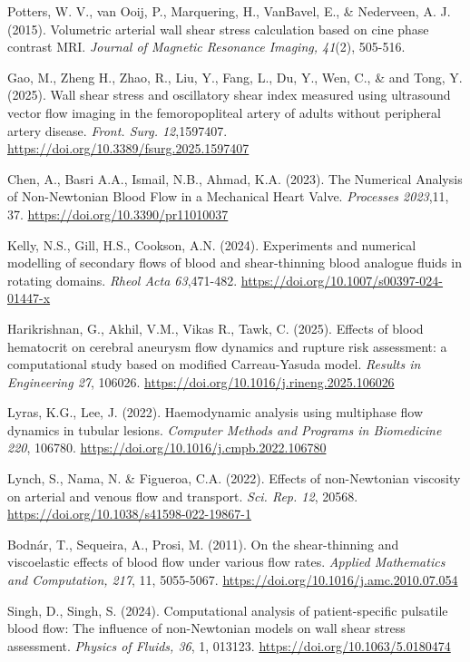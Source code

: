 ﻿\documentclass[12pt,a4paper]{article}
\theoremstyle{definition}
\numberwithin{equation}{section}
\begin{document}
\begin{thebibliography}{}
 Potters, W. V., van Ooij, P., Marquering, H., VanBavel, E., \& Nederveen, A. J. (2015). Volumetric arterial wall shear stress calculation based on cine phase contrast MRI. \textit{Journal of Magnetic Resonance Imaging, 41}(2), 505-516.

 Gao, M., Zheng H., Zhao, R., Liu, Y., Fang, L., Du, Y., Wen, C., \& and Tong, Y. (2025). Wall shear stress and oscillatory shear index measured using ultrasound vector flow imaging in the femoropopliteal artery of adults without peripheral artery disease. \textit{Front. Surg. 12},1597407.  \url{https://doi.org/10.3389/fsurg.2025.1597407}

 Chen, A., Basri A.A., Ismail, N.B., Ahmad, K.A. (2023). The Numerical Analysis of Non-Newtonian Blood Flow in a Mechanical Heart Valve. \textit{Processes 2023},11, 37.  \url{https://doi.org/10.3390/pr11010037}

 Kelly, N.S., Gill, H.S., Cookson, A.N. (2024). Experiments and numerical modelling of secondary flows of blood and shear-thinning blood analogue fluids in rotating domains. \textit{Rheol Acta 63},471-482.  \url{https://doi.org/10.1007/s00397-024-01447-x}

 Harikrishnan, G., Akhil, V.M., Vikas R., Tawk, C. (2025). Effects of blood hematocrit on cerebral aneurysm flow dynamics and rupture risk assessment: a computational study based on modified Carreau-Yasuda model. \textit{Results in Engineering 27}, 106026.  \url{https://doi.org/10.1016/j.rineng.2025.106026}

 Lyras, K.G., Lee, J. (2022). Haemodynamic analysis using multiphase flow dynamics in tubular lesions. \textit{Computer Methods and Programs in Biomedicine 220}, 106780.  \url{https://doi.org/10.1016/j.cmpb.2022.106780}

 Lynch, S., Nama, N. \& Figueroa, C.A. (2022). Effects of non-Newtonian viscosity on arterial and venous flow and transport. \textit{Sci. Rep. 12}, 20568. \url{https://doi.org/10.1038/s41598-022-19867-1}

 Bodnár, T., Sequeira, A., Prosi, M. (2011). On the shear-thinning and viscoelastic effects of blood flow under various flow rates. \textit{Applied Mathematics and Computation, 217}, 11, 5055-5067. \url{https://doi.org/10.1016/j.amc.2010.07.054}

 Singh, D., Singh, S. (2024). Computational analysis of patient-specific pulsatile blood flow: The influence of non-Newtonian models on wall shear stress assessment.
\textit{Physics of Fluids, 36}, 1, 013123. \url{https://doi.org/10.1063/5.0180474}


\end{thebibliography}
\end{document}
